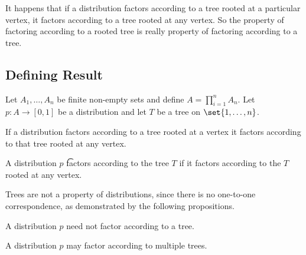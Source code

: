 

It happens that if a distribution factors according to a tree rooted at a particular vertex, it factors according to a tree rooted at any vertex.
So the property of factoring according to a rooted tree is really property of factoring according to a tree.


\subsection{Defining Result}

\begin{prop}
Let $A_1, \dots, A_n$ be finite non-empty sets and define $A = \prod_{i = 1}^{n} A_n$.
Let $p: A \to [0, 1]$ be a distribution and let $T$ be a tree on $\set{1, \dots, n}$.
\end{prop}

\begin{prop}
If a distribution factors according to a tree rooted at a vertex it factors according to that tree rooted at any vertex.
\end{prop}


A distribution $p$
\t{factors according to the tree}{} $T$
if it factors according to the
$T$ rooted at any vertex.


Trees are not a property of distributions,
since there is no one-to-one correspondence,
as demonstrated by the following propositions.


A distribution $p$ need not factor according to a tree.

A distribution
$p$ may factor according to multiple trees.
